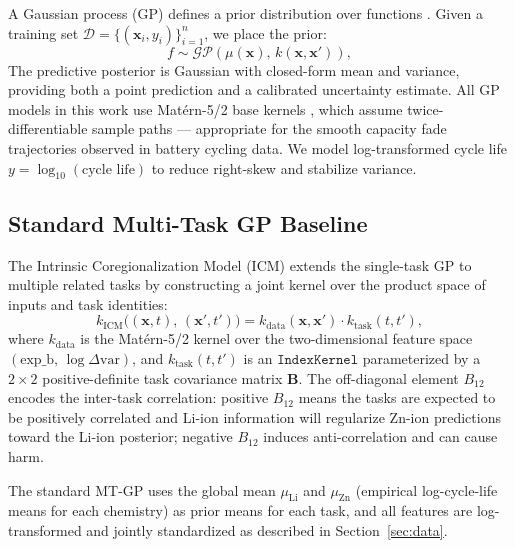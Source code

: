 \documentclass[12pt]{article}
\begin{document}
A Gaussian process (GP) defines a prior distribution over functions
\cite{rasmussen2006}. Given a training set $\mathcal{D} = \{(\mathbf{x}_i,
y_i)\}_{i=1}^{n}$, we place the prior:
\begin{equation}
  f \sim \mathcal{GP}\!\left(\mu(\mathbf{x}),\, k(\mathbf{x}, \mathbf{x}')\right),
  \label{eq:gp_prior}
\end{equation}
The predictive posterior is Gaussian with closed-form mean and variance, providing both a point prediction and a calibrated uncertainty estimate. All GP models in this work use Mat\'ern-5/2
base kernels \cite{rasmussen2006, richardson2017gp}, which assume twice-differentiable sample paths --- appropriate for
the smooth capacity fade trajectories observed in battery cycling data. We model
log-transformed cycle life $y = \log_{10}(\text{cycle life})$ to reduce
right-skew and stabilize variance.

\subsection{Standard Multi-Task GP Baseline}

The Intrinsic Coregionalization Model (ICM) \cite{bonilla2007, alvarez2012kernels} extends the
single-task GP to multiple related tasks by constructing a joint kernel over the
product space of inputs and task identities:
\begin{equation}
  k_{\mathrm{ICM}}\!\bigl((\mathbf{x}, t),\, (\mathbf{x}', t')\bigr)
  = k_{\mathrm{data}}(\mathbf{x}, \mathbf{x}')\cdot k_{\mathrm{task}}(t, t'),
  \label{eq:icm}
\end{equation}
where $k_{\mathrm{data}}$ is the Mat\'ern-5/2 kernel over the two-dimensional
feature space $(\text{exp\_b},\, \log\Delta\mathrm{var})$, and
$k_{\mathrm{task}}(t, t')$ is an $\texttt{IndexKernel}$ parameterized by a
$2\times 2$ positive-definite task covariance matrix $\mathbf{B}$. The
off-diagonal element $B_{12}$ encodes the inter-task correlation: positive
$B_{12}$ means the tasks are expected to be positively correlated and Li-ion
information will regularize Zn-ion predictions toward the Li-ion posterior;
negative $B_{12}$ induces anti-correlation and can cause harm.

The standard MT-GP uses the global mean $\mu_{\mathrm{Li}}$ and $\mu_{\mathrm{Zn}}$
(empirical log-cycle-life means for each chemistry) as prior means for each task,
and all features are log-transformed and jointly standardized as described in
Section~\ref{sec:data}.
\end{document}
